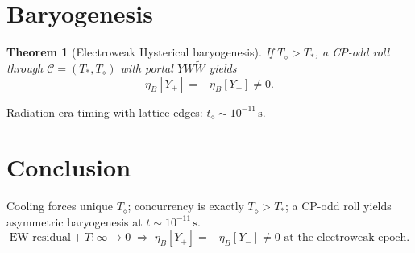 \documentclass[11pt]{article}
\newtheorem{theorem}{Theorem}[section]
\theoremstyle{definition}
\newcommand{\Td}{T_{\diamond}}
\begin{document}
\section{Baryogenesis}
\begin{theorem}[Electroweak Hysterical baryogenesis]
If $\Td>T_*$, a CP-odd roll through $\mathcal C=(T_*,\Td)$ with portal
$YW\widetilde W$ yields
\[
\eta_B[Y_+]=-\eta_B[Y_-]\neq0.
\]
\end{theorem}
Radiation-era timing with lattice edges: $t_\diamond\sim10^{-11}\,\mathrm{s}$.

\section{Conclusion}
Cooling forces unique $\Td$; concurrency is exactly $\Td>T_*$; a CP-odd roll yields
asymmetric baryogenesis at $t\sim10^{-11}\,\mathrm{s}$.
\[
\text{EW residual}+T\!:\!\infty\to0
\;\Longrightarrow\;
\eta_B[Y_+]=-\eta_B[Y_-]\neq0
\text{ at the electroweak epoch.}
\]
\end{document}
